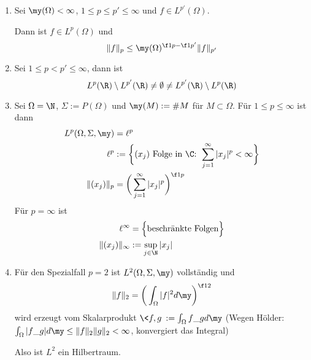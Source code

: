 \documentclass{mycourse}
\begin{document}
\begin{st} \label{2.16}
	\begin{enumerate}[1)]
		\item
			Sei $\my(\Omega) < \infty$, $1 \le p \le p' \le \infty$ und $f \in L^{p'}(\Omega)$.

			Dann ist $f \in L^p(\Omega)$ und 
			\[
				\|f\|_p \le \my(\Omega)^{\f 1p - \f 1{p'}} \|f\|_{p'}
			\]
			\begin{note}
				
			\end{note}
		\item
			Sei $1 \le p < p' \le \infty$, dann ist
			\[
				L^p(\R) \setminus L^{p'}(\R) \neq \emptyset \neq L^{p'}(\R) \setminus L^p(\R)
			\]
		\item
			Sei $\Omega = \N$, $\Sigma := P(\Omega)$ und $\my(M) := \#M$ für $M \subset \Omega$.
			Für $1 \le p \le \infty$ ist dann
			\begin{align*}
				L^p(\Omega, \Sigma, \my) &= \ell^p \\
				\ell^p &:= \bigg\{ (x_j) \text{ Folge in $\C$: } \sum_{j=1}^\infty |x_j|^p < \infty \bigg\} \\
				\|(x_j)\|_p &= \bigg( \sum_{j=1}^\infty |x_j|^p \bigg)^{\f 1p}
			\end{align*}
			Für $p = \infty$ ist
			\begin{align*}
				\ell^\infty &= \Big\{ \text{beschränkte Folgen} \Big\} \\
				\|(x_j)\|_\infty &:= \sup_{j\in \N} |x_j|
			\end{align*}
		\item
			Für den Spezialfall $p=2$ ist $L^2(\Omega, \Sigma, \my)$ vollständig und
			\[
				\|f\|_2 = \bigg( \int_{\Omega} |f|^2 d\my \bigg)^{\f 12}
			\]
			wird erzeugt vom Skalarprodukt $\<f,g\> := \int_{\Omega} f \_g d\my$ (Wegen Hölder: $\int_{\Omega} |f \_g|d\my \le \|f\|_2 \|g\|_2 < \infty$, konvergiert das Integral)

			Also ist $L^2$ ein Hilbertraum.
	\end{enumerate}
\end{st}
\end{document}

